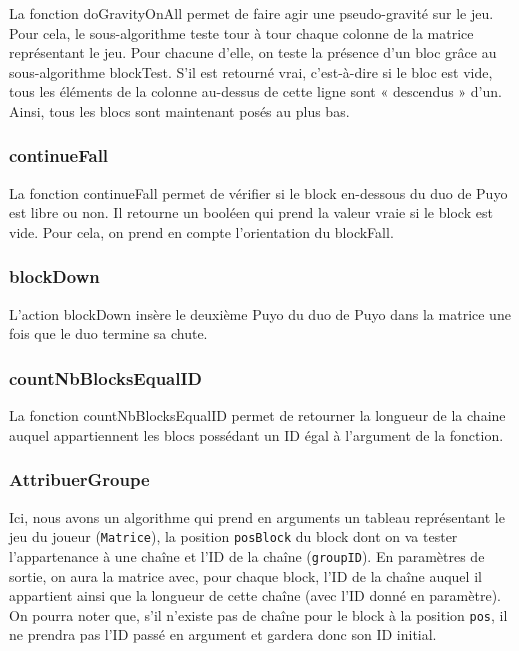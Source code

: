 \documentclass[11pt, final]{report}
\renewcommand{\tt}[1]{\texttt{#1}}
\begin{document}
La fonction doGravityOnAll permet de faire agir une pseudo-gravité sur le jeu. Pour cela, le sous-algorithme teste tour à tour chaque colonne de la matrice représentant le jeu. Pour chacune d’elle, on teste la présence d’un bloc grâce au sous-algorithme blockTest. S’il est retourné vrai, c’est-à-dire si le bloc est vide, tous les éléments de la colonne au-dessus de cette ligne sont « descendus » d’un. Ainsi,  tous les blocs sont maintenant posés au plus bas.
\\

\subsubsection{continueFall}
 

La fonction continueFall permet de vérifier si le block en-dessous du duo de Puyo est libre ou non. Il retourne un booléen qui prend la valeur vraie si le block est vide. Pour cela, on prend en compte l'orientation du blockFall.
\\

\subsubsection{blockDown}


L'action blockDown insère le deuxième Puyo du duo de Puyo dans la matrice une fois que le duo termine sa chute. 
\\

\subsubsection{countNbBlocksEqualID}


La fonction countNbBlocksEqualID permet de retourner la longueur de la chaine auquel appartiennent les blocs possédant un ID égal à l’argument de la fonction.
\\

\subsubsection{AttribuerGroupe}


Ici, nous avons un algorithme qui prend en arguments un tableau représentant le jeu du joueur (\tt{Matrice}), la position \tt{posBlock} du block dont on va tester l'appartenance à une chaîne et l'ID de la chaîne (\tt{groupID}). En paramètres de sortie, on aura la matrice avec, pour chaque block, l'ID de la chaîne auquel il appartient ainsi que la longueur de cette chaîne (avec l'ID donné en paramètre). On pourra noter que, s'il n'existe pas de chaîne pour le block à la position \tt{pos}, il ne prendra pas l'ID passé en argument et gardera donc son ID initial. 
\end{document}
